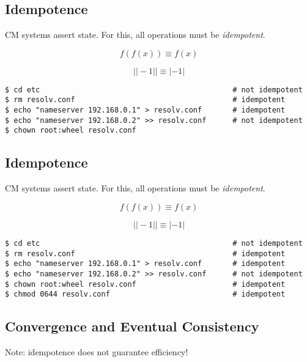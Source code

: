 \documentclass[xga]{xdvislides}
\begin{document}
\subsection{Idempotence}
CM systems assert state.  For this, all operations
must be {\em idempotent}. \\
\vspace{.5in}

\begin{displaymath}
f(f(x)) \equiv f(x)
\end{displaymath}

\begin{displaymath}
| |-1| | \equiv |-1|
\end{displaymath}

\begin{verbatim}
$ cd etc                                            # not idempotent
$ rm resolv.conf                                    # idempotent
$ echo "nameserver 192.168.0.1" > resolv.conf       # idempotent
$ echo "nameserver 192.168.0.2" >> resolv.conf      # not idempotent
$ chown root:wheel resolv.conf
\end{verbatim}

\subsection{Idempotence}
CM systems assert state.  For this, all operations
must be {\em idempotent}. \\
\vspace{.5in}

\begin{displaymath}
f(f(x)) \equiv f(x)
\end{displaymath}

\begin{displaymath}
| |-1| | \equiv |-1|
\end{displaymath}

\begin{verbatim}
$ cd etc                                            # not idempotent
$ rm resolv.conf                                    # idempotent
$ echo "nameserver 192.168.0.1" > resolv.conf       # idempotent
$ echo "nameserver 192.168.0.2" >> resolv.conf      # not idempotent
$ chown root:wheel resolv.conf                      # idempotent
$ chmod 0644 resolv.conf                            # idempotent
\end{verbatim}

\subsection{Convergence and Eventual Consistency}
Note: idempotence does not guarantee efficiency! \\
\vspace{.5in}
\end{document}
